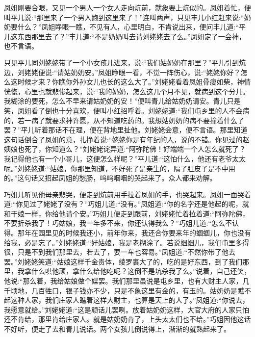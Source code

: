 \begin{parag}
    凤姐刚要合眼，又见一个男人一个女人走向炕前，就象要上炕似的。凤姐着忙，便叫平儿说:“那里来了一个男人跑到这里来了！”连叫两声，只见丰儿小红赶来说:“奶奶要什么？”凤姐睁眼一瞧，不见有人，心里明白，不肯说出来，便问丰儿道:“平儿这东西那里去了？”丰儿道:“不是奶奶叫去请刘姥姥去了么。”凤姐定了一会神，也不言语。
\end{parag}


\begin{parag}
    只见平儿同刘姥姥带了一个小女孩儿进来，说:“我们姑奶奶在那里？”平儿引到炕边，刘姥姥便说:“请姑奶奶安。”凤姐睁眼一看，不觉一阵伤心，说:“姥姥你好？怎么这时候才来？你瞧你外孙女儿也长的这么大了。”刘姥姥看着凤姐骨瘦如柴，神情恍惚，心里也就悲惨起来，说:“我的奶奶，怎么这几个月不见，就病到这个分儿。我糊涂的要死，怎么不早来请姑奶奶的安！”便叫青儿给姑奶奶请安。青儿只是笑，凤姐看了倒也十分喜欢，便叫小红招呼着。刘姥姥道:“我们屯乡里的人不会病的，若一病了就要求神许愿，从不知道吃药的。我想姑奶奶的病不要撞着什么了罢？”平儿听着那话不在理，便在背地里扯他。刘姥姥会意，便不言语。那里知道这句话倒合了凤姐的意，扎挣着说:“姥姥你是有年纪的人，说的不错。你见过的赵姨娘也死了，你知道么？”刘姥姥诧异道:“阿弥陀佛！好端端一个人怎么就死了？我记得他也有一个小哥儿，这便怎么样呢？”平儿道:“这怕什么，他还有老爷太太呢。”刘姥姥道:“姑娘，你那里知道，不好死了是亲生的，隔了肚皮子是不中用的。”这句话又招起凤姐的愁肠，呜呜咽咽的哭起来了。众人都来劝解。
\end{parag}


\begin{parag}
    巧姐儿听见他母亲悲哭，便走到炕前用手拉着凤姐的手，也哭起来。凤姐一面哭着道:“你见过了姥姥了没有？”巧姐儿道:“没有。”凤姐道:“你的名字还是他起的呢，就和干娘一样，你给他请个安。”巧姐儿便走到跟前，刘姥姥忙着拉着道:“阿弥陀佛，不要折杀我了！巧姑娘，我一年多不来，你还认得我么？”巧姐儿道:“怎么不认得。那年在园里见的时候我还小，前年你来，我还合你要来年的蝈蝈儿，你也没有给我，必是忘了。”刘姥姥道:“好姑娘，我是老糊涂了。若说蝈蝈儿，我们屯里多得很，只是不到我们那里去，若去了，要一车也容易。”凤姐道:“不然你带了他去罢。”刘姥姥笑道:“姑娘这样千金贵体，绫罗裹大了的，吃的是好东西，到了我们那里，我拿什么哄他顽，拿什么给他吃呢？这倒不是坑杀我了么。”说着，自己还笑，他说:“那么着，我给姑娘做个媒罢。我们那里虽说是屯乡里，也有大财主人家，几千顷地，几百牲口，银子钱亦不少，只是不象这里有金的，有玉的。姑奶奶是瞧不起这种人家，我们庄家人瞧着这样大财主，也算是天上的人了。”凤姐道:“你说去，我愿意就给。”刘姥姥道:“这是顽话儿罢咧。放着姑奶奶这样，大官大府的人家只怕还不肯给，那里肯给庄家人。就是姑奶奶肯了，上头太太们也不给。”巧姐因他这话不好听，便走了去和青儿说话。两个女孩儿倒说得上，渐渐的就熟起来了。
\end{parag}


